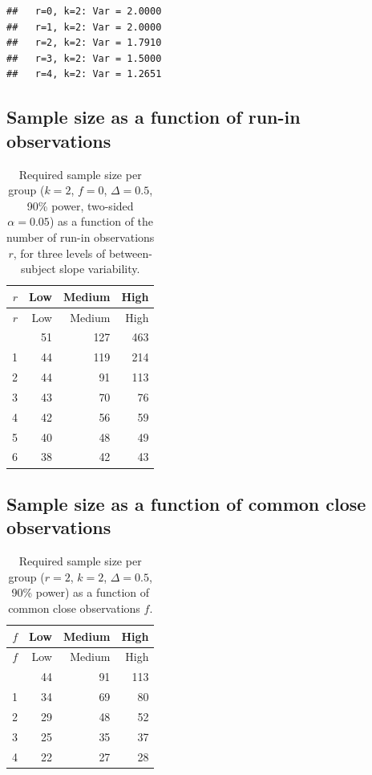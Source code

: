 \documentclass[
]{article}
\begin{document}
\begin{verbatim}
##   r=0, k=2: Var = 2.0000
##   r=1, k=2: Var = 2.0000
##   r=2, k=2: Var = 1.7910
##   r=3, k=2: Var = 1.5000
##   r=4, k=2: Var = 1.2651
\end{verbatim}

\subsection{Sample size as a function of run-in
observations}\label{sample-size-as-a-function-of-run-in-observations}

\begin{longtable}[]{@{}rrrr@{}}
\caption{Required sample size per group (\(k=2\), \(f=0\),
\(\Delta=0.5\), 90\% power, two-sided \(\alpha=0.05\)) as a function of
the number of run-in observations \(r\), for three levels of
between-subject slope variability.}\tabularnewline
\toprule\noalign{}
\(r\) & Low & Medium & High \\
\midrule\noalign{}
\endfirsthead
\toprule\noalign{}
\(r\) & Low & Medium & High \\
\midrule\noalign{}
\endhead
\bottomrule\noalign{}
\endlastfoot
0 & 51 & 127 & 463 \\
1 & 44 & 119 & 214 \\
2 & 44 & 91 & 113 \\
3 & 43 & 70 & 76 \\
4 & 42 & 56 & 59 \\
5 & 40 & 48 & 49 \\
6 & 38 & 42 & 43 \\
\end{longtable}

\subsection{Sample size as a function of common close
observations}\label{sample-size-as-a-function-of-common-close-observations}

\begin{longtable}[]{@{}rrrr@{}}
\caption{Required sample size per group (\(r=2\), \(k=2\),
\(\Delta=0.5\), 90\% power) as a function of common close observations
\(f\).}\tabularnewline
\toprule\noalign{}
\(f\) & Low & Medium & High \\
\midrule\noalign{}
\endfirsthead
\toprule\noalign{}
\(f\) & Low & Medium & High \\
\midrule\noalign{}
\endhead
\bottomrule\noalign{}
\endlastfoot
0 & 44 & 91 & 113 \\
1 & 34 & 69 & 80 \\
2 & 29 & 48 & 52 \\
3 & 25 & 35 & 37 \\
4 & 22 & 27 & 28 \\
\end{longtable}
\end{document}
